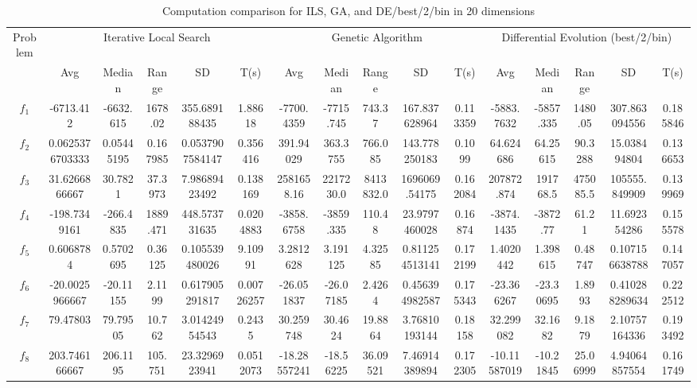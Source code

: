 \documentclass[paper=a4, fontsize=11pt]{scrartcl} %
\numberwithin{equation}{section} %
\numberwithin{figure}{section} %
\numberwithin{table}{section} %
\begin{document}
\begin{landscape}
	\begin{table}
		\tiny
		\centering
		\caption{Computation comparison for ILS, GA, and DE/best/2/bin in 20 dimensions}
		\label{Tab1d}
		\begin{tabular}{c|ccccc|ccccc|ccccc}
			\noalign{\smallskip}\hline\noalign{\smallskip}
			Problem & \multicolumn{5}{c}{Iterative Local Search}& \multicolumn{5}{|c|}{Genetic Algorithm}
			&  \multicolumn{5}{c}{Differential Evolution (best/2/bin)} \\ 
			\noalign{\smallskip}\hline\noalign{\smallskip}
			& Avg & Median & Range & SD & T(s) & Avg & Median
			& Range & SD & T(s) & Avg & Median & Range & SD &
			T(s) \\ 
			\noalign{\smallskip}\hline\noalign{\smallskip}
			$f_{1}$ & -6713.412 & -6632.615 & 1678.02 & 355.689188435 & 1.88618 & -7700.4359 & -7715.745 & 743.37 & 167.837628964 & 0.113359 & -5883.7632 & -5857.335 & 1480.05 & 307.863094556 & 0.185846\\
			$f_{2}$ & 0.0625376703333 & 0.05445195 & 0.167985 & 0.0537907584147 & 0.356416 & 391.94029 & 363.3755 & 766.085 & 143.778250183 & 0.1099 & 64.624686 & 64.25615 & 90.3288 & 15.038494804 & 0.136653\\
			$f_{3}$ & 31.6266866667 & 30.7821 & 37.3973 & 7.98689423492 & 0.138169 & 2581658.16 & 2217230.0 & 8413832.0 & 1696069.54175 & 0.162084 & 207872.874 & 191768.5 & 475085.5 & 105555.849909 & 0.139969\\
			$f_{4}$ & -198.7349161 & -266.4835 & 1889.471 & 448.573731635 & 0.0204883 & -3858.6758 & -3859.335 & 110.48 & 23.9797460028 & 0.16874 & -3874.1435 & -3872.77 & 61.21 & 11.692354286 & 0.155578\\
			$f_{5}$ & 0.6068784 & 0.5702695 & 0.36125 & 0.105539480026 & 9.10991 & 3.2812628 & 3.191125 & 4.32585 & 0.811254513141 & 0.172199 & 1.4020442 & 1.398615 & 0.48747 & 0.107156638788 & 0.147057\\
			$f_{6}$ & -20.0025966667 & -20.11155 & 2.1199 & 0.617905291817 & 0.00726257 & -26.051837 & -26.07185 & 2.4264 & 0.456394982587 & 0.175343 & -23.366267 & -23.30695 & 1.8993 & 0.410288289634 & 0.222512\\
			$f_{7}$ & 79.47803 & 79.79505 & 10.762 & 3.01424954543 & 0.2435 & 30.259748 & 30.4624 & 19.8864 & 3.76810193144 & 0.18158 & 32.299082 & 32.1682 & 9.1879 & 2.10757164336 & 0.193492\\
			$f_{8}$ & 203.746166667 & 206.1195 & 105.751 & 23.3296923941 & 0.0512073 & -18.28557241 & -18.56225 & 36.09521 & 7.46914389894 & 0.172305 & -10.11587019 & -10.21845 & 25.06999 & 4.94064857554 & 0.161749\\

\end{tabular}
\end{table}
\end{landscape}
\end{document}

